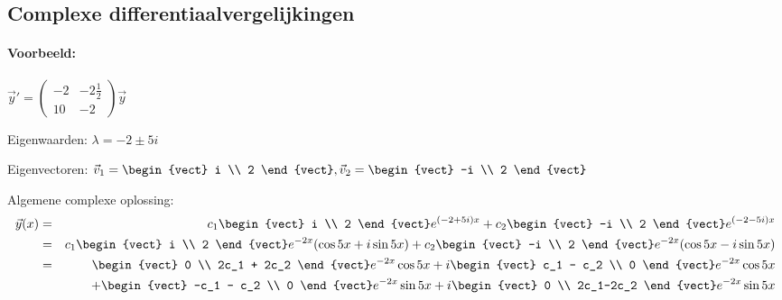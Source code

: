 \subsection{Complexe differentiaalvergelijkingen}
\paragraph{Voorbeeld:}
$\vec{y}' = \begin{pmatrix} -2 & -2 \frac{1}{2} \\ 10 & -2 \end{pmatrix} \vec{y}$ 

Eigenwaarden: $\lambda = -2 \pm 5i$

Eigenvectoren: $\vec{v}_1 = \begin{vect} i \\ 2 \end{vect}, \vec{v}_2 = \begin{vect} -i \\ 2 \end{vect}$

Algemene complexe oplossing:
\begin{eqnarray*}
	\vec{y}(x) &=& c_1 \begin{vect} i \\ 2 \end{vect} e^{(-2 + 5i)x} + c_2 \begin{vect} -i \\ 2 \end{vect} e^{(-2-5i)x} \\
	&=& c_1 \begin{vect} i \\ 2 \end{vect} e^{-2x}(\cos 5x + i \sin 5x ) + c_2 \begin{vect} -i \\ 2 \end{vect} e^{-2x}(\cos 5x - i \sin 5x ) \\
	&=& \begin{vect} 0 \\ 2c_1 + 2c_2 \end{vect} e^{-2x}\cos 5x + i \begin{vect} c_1 - c_2 \\ 0 \end{vect} e^{-2x} \cos 5x \\
	&&+ \begin{vect} -c_1 - c_2 \\ 0 \end{vect} e^{-2x}\sin 5x + i \begin{vect} 0 \\ 2c_1-2c_2 \end{vect} e^{-2x}\sin 5x
\end{eqnarray*}

